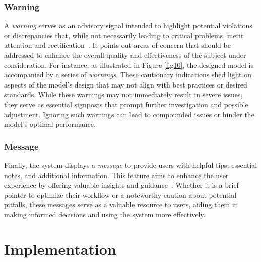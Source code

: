    \subsubsection{Warning}
    A \textit{warning} serves as an advisory signal intended to highlight potential violations or discrepancies that, while not necessarily leading to critical problems, merit attention and rectification~\cite{askaripoor2023designer}. It points out areas of concern that should be addressed to enhance the overall quality and effectiveness of the subject under consideration. For instance, as illustrated in Figure \ref{fig10}, the designed model is accompanied by a series of \textit{warnings}. These cautionary indications shed light on aspects of the model's design that may not align with best practices or desired standards. While these warnings may not immediately result in severe issues, they serve as essential signposts that prompt further investigation and possible adjustment. Ignoring such warnings can lead to compounded issues or hinder the model's optimal performance.


    
    
    \subsubsection{Message}
    
    Finally, the system displays a \textit{message} to provide users with helpful tips, essential notes, and additional information. This feature aims to enhance the user experience by offering valuable insights and guidance~\cite{askaripoor2023designer}. Whether it is a brief pointer to optimize their workflow or a noteworthy caution about potential pitfalls, these messages serve as a valuable resource to users, aiding them in making informed decisions and using the system more effectively.
    
    
    
   




\section{Implementation}
    
